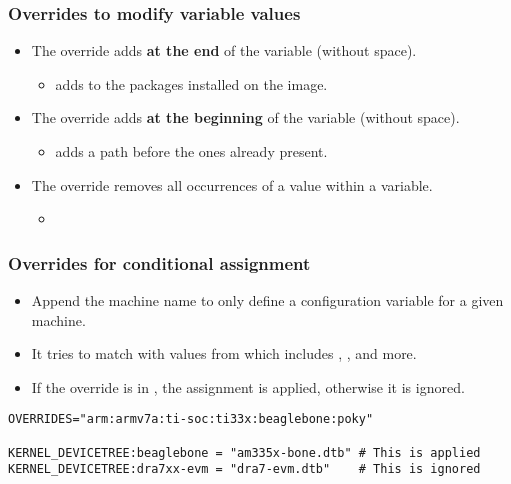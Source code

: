\begin{frame}
  \frametitle{Overrides to modify variable values}
  \begin{itemize}
    \item The  override adds {\bf at the end} of the variable
      (without space).
      \begin{itemize}
        \item {} adds
           to the packages installed on the image.
      \end{itemize}
    \item The  override adds {\bf at the beginning} of the
      variable (without space).
      \begin{itemize}
        \item {}
          adds a path before the ones already present.
      \end{itemize}
    \item The  override removes all occurrences of a value
      within a variable.
      \begin{itemize}
        \item {}
      \end{itemize}
  \end{itemize}
\end{frame}

\begin{frame}[fragile]
  \frametitle{Overrides for conditional assignment}
  \begin{itemize}
    \item Append the machine name to only define a configuration variable
      for a given machine.
    \item It tries to match with values from  which
      includes , , and more.
    \item If the override is in , the assignment is
      applied, otherwise it is ignored.
  \end{itemize}
  \begin{block}{}
    \begin{verbatim}
OVERRIDES="arm:armv7a:ti-soc:ti33x:beaglebone:poky"

KERNEL_DEVICETREE:beaglebone = "am335x-bone.dtb" # This is applied
KERNEL_DEVICETREE:dra7xx-evm = "dra7-evm.dtb"    # This is ignored
    \end{verbatim}
  \end{block}
\end{frame}

